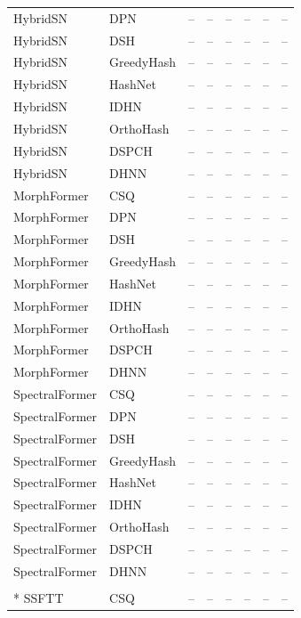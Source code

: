 \begin{longtable}{llrrrrrr}
HybridSN & DPN & -- & -- & -- & -- & -- & -- \\
HybridSN & DSH & -- & -- & -- & -- & -- & -- \\
HybridSN & GreedyHash & -- & -- & -- & -- & -- & -- \\
HybridSN & HashNet & -- & -- & -- & -- & -- & -- \\
HybridSN & IDHN & -- & -- & -- & -- & -- & -- \\
HybridSN & OrthoHash & -- & -- & -- & -- & -- & -- \\
HybridSN & DSPCH & -- & -- & -- & -- & -- & -- \\
HybridSN & DHNN & -- & -- & -- & -- & -- & -- \\
\addlinespace
MorphFormer & CSQ & -- & -- & -- & -- & -- & -- \\
MorphFormer & DPN & -- & -- & -- & -- & -- & -- \\
MorphFormer & DSH & -- & -- & -- & -- & -- & -- \\
MorphFormer & GreedyHash & -- & -- & -- & -- & -- & -- \\
MorphFormer & HashNet & -- & -- & -- & -- & -- & -- \\
MorphFormer & IDHN & -- & -- & -- & -- & -- & -- \\
MorphFormer & OrthoHash & -- & -- & -- & -- & -- & -- \\
MorphFormer & DSPCH & -- & -- & -- & -- & -- & -- \\
MorphFormer & DHNN & -- & -- & -- & -- & -- & -- \\
\addlinespace
SpectralFormer & CSQ & -- & -- & -- & -- & -- & -- \\
SpectralFormer & DPN & -- & -- & -- & -- & -- & -- \\
SpectralFormer & DSH & -- & -- & -- & -- & -- & -- \\
SpectralFormer & GreedyHash & -- & -- & -- & -- & -- & -- \\
SpectralFormer & HashNet & -- & -- & -- & -- & -- & -- \\
SpectralFormer & IDHN & -- & -- & -- & -- & -- & -- \\
SpectralFormer & OrthoHash & -- & -- & -- & -- & -- & -- \\
SpectralFormer & DSPCH & -- & -- & -- & -- & -- & -- \\
SpectralFormer & DHNN & -- & -- & -- & -- & -- & -- \\
\addlinespace
\multicolumn{8}{c}{\textbf{Houston2018}}\\*
\midrule
SSFTT & CSQ & -- & -- & -- & -- & -- & -- \\

\end{longtable}
